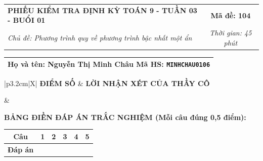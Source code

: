 \documentclass[12pt,a4paper]{article}
\begin{document}
\newpage


\noindent
\begin{tabularx}{\linewidth}{|X|c|}
\hline
\textbf{PHIẾU KIỂM TRA ĐỊNH KỲ TOÁN 9 - TUẦN 03 - BUỔI 01} & \textbf{Mã đề: 104} \\
\textit{Chủ đề: Phương trình quy về phương trình bậc nhất một ẩn} & \textit{Thời gian: 45 phút} \\
\hline
\end{tabularx}

\vspace{1mm}

\noindent
\begin{tabularx}{\linewidth}{|X|}
\hline
\rule[-2mm]{0pt}{7.5mm}\textbf{Họ và tên:} \textbf{\large Nguyễn Thị Minh Châu} \hfill \textbf{Mã HS:} \texttt{MINHCHAU0106} \quad \\
\hline
\end{tabularx}

\vspace{1mm}

\noindent
\begin{tabularx}{\linewidth}{|p{3.2cm}|X|}
\hline
\centering\textbf{ĐIỂM SỐ} & \centering\textbf{LỜI NHẬN XÉT CỦA THẦY CÔ} \tabularnewline
\hline
\rule{0pt}{1.3cm} & \tabularnewline
\hline
\end{tabularx}

\vspace{1.2mm}

\noindent\textbf{BẢNG ĐIỀN ĐÁP ÁN TRẮC NGHIỆM (Mỗi câu đúng 0,5 điểm):}
\vspace{0.8mm}

\noindent
\renewcommand{\arraystretch}{1.35}
\begin{tabularx}{\linewidth}{|c|*{5}{>{\centering\arraybackslash}X|}}
\hline
\textbf{Câu} & \textbf{1} & \textbf{2} & \textbf{3} & \textbf{4} & \textbf{5} \\
\hline
\textbf{Đáp án} & & & & & \\
\hline
\end{tabularx}
\renewcommand{\arraystretch}{1.0}

\vspace{1.5mm}
\end{document}
